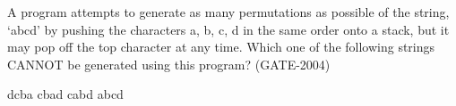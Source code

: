 \begin{questyle}
  \question  A program attempts to generate as many permutations as possible of the string, ‘abcd’ by pushing the
            characters a, b, c, d in the same order onto a stack, but it may pop off the top character at any time.
            Which one of the following strings CANNOT be generated using this program?  (GATE-2004)

  \begin{choices}
    \choice         dcba
    \choice         cbad
    \choice         cabd
    \CorrectChoice  abcd
  \end{choices}
\end{questyle}
